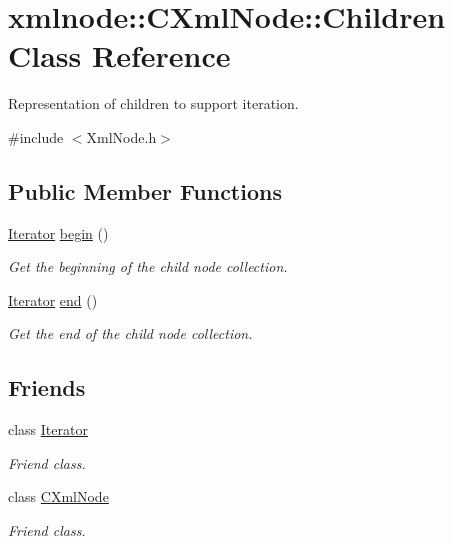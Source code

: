 \hypertarget{classxmlnode_1_1_c_xml_node_1_1_children}{}\section{xmlnode\+:\+:C\+Xml\+Node\+:\+:Children Class Reference}
\label{classxmlnode_1_1_c_xml_node_1_1_children}


Representation of children to support iteration.  




{\ttfamily \#include $<$Xml\+Node.\+h$>$}

\subsection*{Public Member Functions}
\begin{DoxyCompactItemize}
\item 
\mbox{\hyperlink{classxmlnode_1_1_c_xml_node_1_1_iterator}{Iterator}} \mbox{\hyperlink{classxmlnode_1_1_c_xml_node_1_1_children_a8f0cac16fdda64bbf10cb08eba606dd1}{begin}} ()
\begin{DoxyCompactList}\small\item\em Get the beginning of the child node collection. \end{DoxyCompactList}\item 
\mbox{\hyperlink{classxmlnode_1_1_c_xml_node_1_1_iterator}{Iterator}} \mbox{\hyperlink{classxmlnode_1_1_c_xml_node_1_1_children_a3fe6fb9e62c63d6a9ea46653608d42e8}{end}} ()
\begin{DoxyCompactList}\small\item\em Get the end of the child node collection. \end{DoxyCompactList}\end{DoxyCompactItemize}
\subsection*{Friends}
\begin{DoxyCompactItemize}
\item 
\mbox{\label{classxmlnode_1_1_c_xml_node_1_1_children_a9830fc407400559db7e7783cc10a9394}} 
class \mbox{\hyperlink{classxmlnode_1_1_c_xml_node_1_1_children_a9830fc407400559db7e7783cc10a9394}{Iterator}}
\begin{DoxyCompactList}\small\item\em Friend class. \end{DoxyCompactList}\item 
\mbox{\label{classxmlnode_1_1_c_xml_node_1_1_children_a770307dc9d4e2e7005bcf200bae3066a}} 
class \mbox{\hyperlink{classxmlnode_1_1_c_xml_node_1_1_children_a770307dc9d4e2e7005bcf200bae3066a}{C\+Xml\+Node}}
\begin{DoxyCompactList}\small\item\em Friend class. \end{DoxyCompactList}\end{DoxyCompactItemize}


